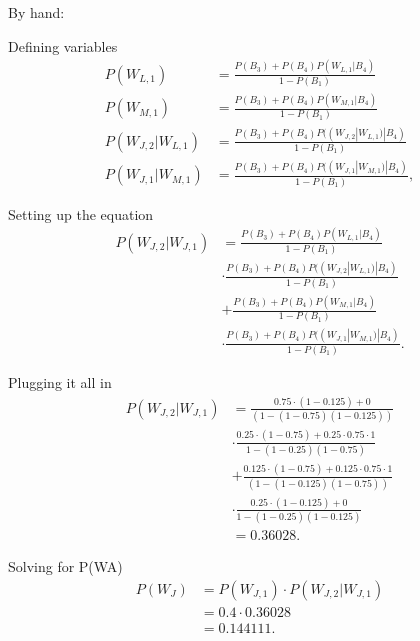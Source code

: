 \documentclass[11pt]{article}
\begin{document}
By hand:

Defining variables
\begin{align*}
    P(W_{L, 1}) &= \frac{P(B_3)+ P(B_4)P(W_{L, 1} | B_4)}{1 - P(B_1)}\\
    P(W_{M, 1}) &= \frac{P(B_3) + P(B_4)P(W_{M, 1} | B_4)}{1 - P(B_1)}\\
    P(W_{J, 2} | W_{L, 1}) &= \frac{P(B_3) + P(B_4)P((W_{J, 2} | W_{L, 1}) | B_4)}{1 - P(B_1)}\\
    P(W_{J, 1} | W_{M, 1}) &= \frac{P(B_3) + P(B_4)P((W_{J, 1} | W_{M, 1}) | B_4)}{1 - P(B_1)},
\end{align*}

Setting up the equation
\begin{align*}
    P(W_{J, 2} | W_{J, 1}) &= \frac{P(B_3)+ P(B_4)P(W_{L, 1} | B_4)}{1 - P(B_1)}\\
    &\cdot \frac{P(B_3) + P(B_4)P((W_{J, 2} | W_{L, 1}) | B_4)}{1 - P(B_1)}\\
    &+ \frac{P(B_3) + P(B_4)P(W_{M, 1} | B_4)}{1 - P(B_1)}\\
    &\cdot \frac{P(B_3) + P(B_4)P((W_{J, 1} | W_{M, 1}) | B_4)}{1 - P(B_1)}.
\end{align*}

Plugging it all in
\begin{align*}
    P(W_{J, 2} | W_{J, 1}) &= \frac{0.75 \cdot (1-0.125) + 0}{(1 - (1-0.75)(1-0.125))}\\
    &\cdot \frac{0.25 \cdot (1-0.75) + 0.25 \cdot 0.75 \cdot 1}{1-(1-0.25)(1-0.75)}\\
    &+ \frac{0.125 \cdot (1-0.75) + 0.125 \cdot 0.75 \cdot 1}{(1 - (1-0.125)(1-0.75))} \\
    &\cdot \frac{0.25 \cdot (1-0.125) + 0}{1-(1-0.25)(1-0.125)}\\
    &= 0.36028.
\end{align*}


Solving for P(WA)
\begin{align*}
    P(W_J) &= P(W_{J, 1}) \cdot P(W_{J, 2} | W_{J, 1})\\
    &= 0.4 \cdot 0.36028\\
    &= 0.144111.
\end{align*}
\end{document}

